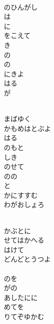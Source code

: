 \documentclass[10pt,b5j]{tarticle} %
\begin{document}
\vspace{1.5em} %
\newcommand{\linespace}{0.5em} %
\newcommand{\blocksize}{0.5\hsize} %
\newcommand{\itemmargin}{6em} %
\begin{enumerate} %
    \setlength{\itemindent}{\itemmargin} %
    \begin{minipage}[c]{\blocksize}
    
        \vspace{\linespace}
        \item~\\
        のひんがし\\
        は\\
        に\\
        をこえて\\
        き\\
        の\\
        の\\
        にきよ\\
        はる\\
        が
        
        \vspace{\linespace}
        \item~\\
        まばゆく\\
        かもめはとぶよ\\
        はる\\
        のもと\\
        しき\\
        のせて\\
        のの\\
        と\\
        かにすすむ\\
        わがおしょろ
        
        \vspace{\linespace}
        \item~\\
        かぶとに\\
        せてはかへる\\
        はけて\\
        どんどとうつよ\\
        \\
        のを\\
        がの\\
        あしたにに\\
        めてを\\
        りてぞゆかむ
        

\end{minipage}
\end{enumerate}
\end{document}
